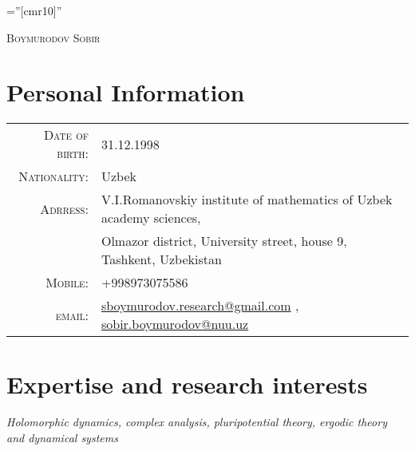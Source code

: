 \documentclass[a4paper,10pt]{article}
\begin{document}

\pagestyle{empty} %

\font\fb=''[cmr10]'' %

\par{\centering
		{\Huge   \textsc{Boymurodov Sobir}
	}\bigskip\par}


\section{Personal Information}

\begin{tabular}{rl}
    \textsc{Date of birth:} & 31.12.1998 \\
     \textsc{Nationality:} & Uzbek \\
    \textsc{Adrress:}   & V.I.Romanovskiy institute of mathematics of Uzbek academy sciences,\\
    \textsc{}   & Olmazor district, University street, house 9, Tashkent, Uzbekistan \\
    \textsc{Mobile:}     &+998973075586\\
    \textsc{email:}     & \href{mailto:sboymurodov.research@gmail.com}{sboymurodov.research@gmail.com}  ,  \href{mailto:sobir.boymurodov@nuu.uz}{sobir.boymurodov@nuu.uz} \\

    
\end{tabular}

\section{Expertise and research interests}

 \emph{Holomorphic dynamics, complex analysis, pluripotential theory, ergodic theory and dynamical systems}  
\end{document}
